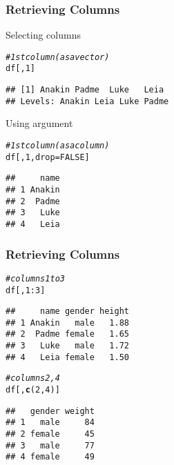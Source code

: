 \documentclass[12pt]{beamer}\usepackage[]{graphicx}\usepackage[]{color}
\makeatletter
\newcommand{\hlnum}[1]{\textcolor[rgb]{0.686,0.059,0.569}{#1}}%
\newcommand{\hlcom}[1]{\textcolor[rgb]{0.678,0.584,0.686}{\textit{#1}}}%
\newcommand{\hlopt}[1]{\textcolor[rgb]{0,0,0}{#1}}%
\newcommand{\hlstd}[1]{\textcolor[rgb]{0.345,0.345,0.345}{#1}}%
\newcommand{\hlkwc}[1]{\textcolor[rgb]{0.333,0.667,0.333}{#1}}%
\newcommand{\hlkwd}[1]{\textcolor[rgb]{0.737,0.353,0.396}{\textbf{#1}}}%
\newenvironment{kframe}{%
 \def\at@end@of@kframe{}%
 \ifinner\ifhmode%
  \def\at@end@of@kframe{\end{minipage}}%
  \begin{minipage}{\columnwidth}%
 \fi\fi%
 \def\FrameCommand##1{\hskip\@totalleftmargin \hskip-\fboxsep
 \colorbox{shadecolor}{##1}\hskip-\fboxsep
     \hskip-\linewidth \hskip-\@totalleftmargin \hskip\columnwidth}%
 \MakeFramed {\advance\hsize-\width
   \@totalleftmargin\z@ \linewidth\hsize
   \@setminipage}}%
 {\par\unskip\endMakeFramed%
 \at@end@of@kframe}
\newenvironment{knitrout}{}{} %
\makeatother
\begin{document}

\begin{frame}[fragile]
\frametitle{Retrieving Columns}

Selecting columns
\begin{knitrout}\footnotesize
{}\color{fgcolor}\begin{kframe}
\begin{alltt}
\hlcom{# 1st column (as a vector)}
\hlstd{df[ ,} \hlnum{1}\hlstd{]}
\end{alltt}
\begin{verbatim}
## [1] Anakin Padme  Luke   Leia  
## Levels: Anakin Leia Luke Padme
\end{verbatim}
\end{kframe}
\end{knitrout}

Using argument 
\begin{knitrout}\footnotesize
{}\color{fgcolor}\begin{kframe}
\begin{alltt}
\hlcom{# 1st column (as a column)}
\hlstd{df[ ,} \hlnum{1}\hlstd{,} \hlkwc{drop} \hlstd{=} \hlnum{FALSE}\hlstd{]}
\end{alltt}
\begin{verbatim}
##     name
## 1 Anakin
## 2  Padme
## 3   Luke
## 4   Leia
\end{verbatim}
\end{kframe}
\end{knitrout}

\end{frame}


\begin{frame}[fragile]
\frametitle{Retrieving Columns}

\begin{knitrout}\footnotesize
{}\color{fgcolor}\begin{kframe}
\begin{alltt}
\hlcom{# columns 1 to 3}
\hlstd{df[ ,} \hlnum{1}\hlopt{:}\hlnum{3}\hlstd{]}
\end{alltt}
\begin{verbatim}
##     name gender height
## 1 Anakin   male   1.88
## 2  Padme female   1.65
## 3   Luke   male   1.72
## 4   Leia female   1.50
\end{verbatim}
\begin{alltt}
\hlcom{# columns 2, 4}
\hlstd{df[ ,} \hlkwd{c}\hlstd{(}\hlnum{2}\hlstd{,}\hlnum{4}\hlstd{)]}
\end{alltt}
\begin{verbatim}
##   gender weight
## 1   male     84
## 2 female     45
## 3   male     77
## 4 female     49
\end{verbatim}
\end{kframe}
\end{knitrout}

\end{frame}
\end{document}

